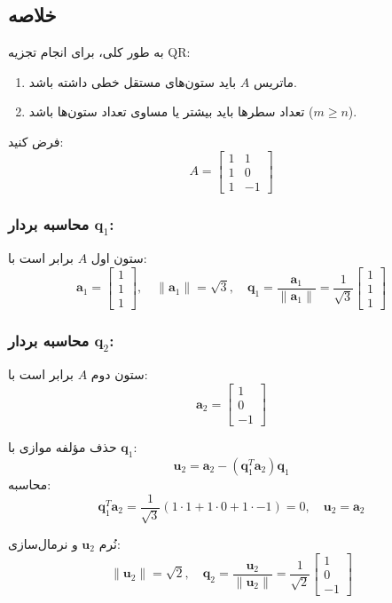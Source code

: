 \subsection*{خلاصه}
به طور کلی، برای انجام تجزیه QR:
\begin{enumerate}
	\item ماتریس \( A \) باید ستون‌های مستقل خطی داشته باشد.
	\item تعداد سطرها باید بیشتر یا مساوی تعداد ستون‌ها باشد (\( m \geq n \)).
\end{enumerate}
\begin{example}
	فرض کنید:
	\[
	A = \begin{bmatrix}
		1 & 1 \\
		1 & 0 \\
		1 & -1
	\end{bmatrix}
	\]
\end{example}
\subsubsection*{محاسبه بردار \( \mathbf{q}_1 \):}
ستون اول \( A \) برابر است با:
\[
\mathbf{a}_1 = \begin{bmatrix} 1 \\ 1 \\ 1 \end{bmatrix}, \quad
\|\mathbf{a}_1\| = \sqrt{3}, \quad
\mathbf{q}_1 = \frac{\mathbf{a}_1}{\|\mathbf{a}_1\|} = \frac{1}{\sqrt{3}} \begin{bmatrix} 1 \\ 1 \\ 1 \end{bmatrix}
\]

\subsubsection*{محاسبه بردار \( \mathbf{q}_2 \):}
ستون دوم \( A \) برابر است با:
\[
\mathbf{a}_2 = \begin{bmatrix} 1 \\ 0 \\ -1 \end{bmatrix}
\]

حذف مؤلفه موازی با \( \mathbf{q}_1 \):
\[
\mathbf{u}_2 = \mathbf{a}_2 - (\mathbf{q}_1^T \mathbf{a}_2) \mathbf{q}_1
\]
محاسبه:
\[
\mathbf{q}_1^T \mathbf{a}_2 = \frac{1}{\sqrt{3}} (1 \cdot 1 + 1 \cdot 0 + 1 \cdot -1) = 0, \quad \mathbf{u}_2 = \mathbf{a}_2
\]

نُرم \( \mathbf{u}_2 \) و نرمال‌سازی:
\[
\|\mathbf{u}_2\| = \sqrt{2}, \quad \mathbf{q}_2 = \frac{\mathbf{u}_2}{\|\mathbf{u}_2\|} = \frac{1}{\sqrt{2}} \begin{bmatrix} 1 \\ 0 \\ -1 \end{bmatrix}
\]

